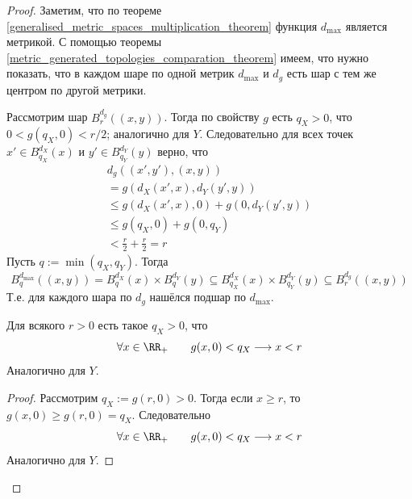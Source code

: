 \documentclass[12pt,a4paper]{article}
\begin{document}
    \begin{proof}
        Заметим, что по теореме \ref{generalised_metric_spaces_multiplication_theorem} функция $d_{\max}$ является метрикой. С помощью теоремы \ref{metric_generated_topologies_comparation_theorem} имеем, что нужно показать, что в каждом шаре по одной метрик $d_{\max}$ и $d_g$ есть шар с тем же центром по другой метрики.

        Рассмотрим шар $B_r^{d_g}((x, y))$. Тогда по свойству $g$ есть $q_X > 0$, что $0 < g(q_X, 0) < r/2$; аналогично для $Y$. Следовательно для всех точек $x' \in B_{q_X}^{d_X}(x)$ и $y' \in B_{q_Y}^{d_Y}(y)$ верно, что
        \begin{multline*}
            d_g((x', y'), (x, y))\\
            = g(d_X(x', x), d_Y(y', y))\\
            \leqslant g(d_X(x', x), 0) + g(0, d_Y(y', y))\\
            \leqslant g(q_X, 0) + g(0, q_Y)\\
            < \frac{r}{2} + \frac{r}{2} = r
        \end{multline*}
        Пусть $q := \min(q_X, q_Y)$. Тогда
        \[B_q^{d_{\max}}((x, y)) = B_q^{d_X}(x) \times B_q^{d_Y}(y) \subseteq B_{q_X}^{d_X}(x) \times B_{q_Y}^{d_Y}(y) \subseteq B_r^{d_g}((x, y))\]
        Т.е. для каждого шара по $d_g$ нашёлся подшар по $d_{\max}$.

        \begin{thlemma}
            Для всякого $r > 0$ есть такое $q_X > 0$, что
            \[\forall x \in \RR_+\qquad g(x, 0) < q_X \longrightarrow x < r\]
            Аналогично для $Y$.
        \end{thlemma}

        \begin{proof}
            Рассмотрим $q_X := g(r, 0) > 0$. Тогда если $x \geqslant r$, то $g(x, 0) \geqslant g(r, 0) = q_X$. Следовательно
            \[\forall x \in \RR_+\qquad g(x, 0) < q_X \longrightarrow x < r\]
            Аналогично для $Y$.
        \end{proof}


\end{proof}
\end{document}
